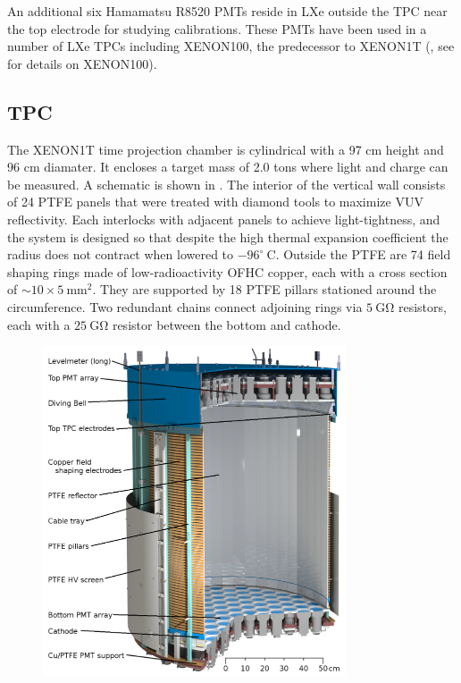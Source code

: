 An additional six Hamamatsu R8520 PMTs reside in LXe outside the TPC near the top electrode for studying calibrations.  These PMTs have
been used in a number of LXe TPCs including XENON100, the predecessor to XENON1T (, see  for
details on XENON100).




\subsection{TPC}
\label{subsec:xenon1t_tpc}
The XENON1T time projection chamber is cylindrical with a 97 cm height and 96 cm diamater.  It encloses a target mass of 2.0 tons where
light and charge can be measured.  A schematic is shown in .  The interior of the vertical wall consists of 24
PTFE panels that were treated with diamond tools to
maximize VUV reflectivity.  Each interlocks with adjacent panels to achieve light-tightness, and the system is designed so that despite
the high thermal expansion coefficient the radius does not contract when lowered to $-96^{\circ}\ \mathrm{C}$.  Outside the PTFE are 74
field shaping rings made of low-radioactivity OFHC copper, each with a cross section of ${\sim} 10 \times 5\ \mathrm{mm^{2}}$.  They are
supported by 18 PTFE pillars stationed around the circumference.  Two redundant
chains connect adjoining rings via $5\ \mathrm{G \Omega}$ resistors, each with a $25\ \mathrm{G \Omega}$ resistor between the bottom and
cathode.

\begin{figure}
\centering
\includegraphics[width=0.8\textwidth]{XENON1TTPC}
\label{fig:xenon1t_tpc_tpc}
\end{figure}


